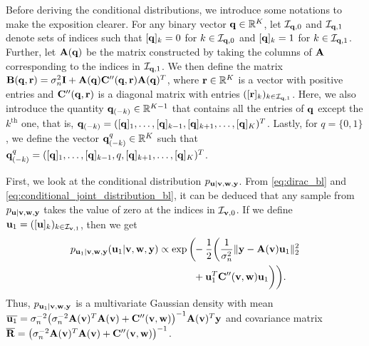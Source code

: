 \documentclass[journal]{IEEEtran}
\begin{document}
Before deriving the conditional distributions, we introduce some notations to make the exposition clearer. For any binary vector ${\bf{q}} \in \mathbb{R}^K$, let $\mathcal{I}_{{\bf{q}}, 0}$ and $\mathcal{I}_{{\bf{q}}, 1}$ denote sets of indices such that $[{\bf{q}}]_k = 0$ for $k \in \mathcal{I}_{{\bf{q}}, 0}$ and $[{\bf{q}}]_k = 1$ for $k \in \mathcal{I}_{{\bf{q}}, 1}$. Further, let ${\bf{A}}({\bf{q}})$ be the matrix constructed by taking the columns of ${\bf{A}}$ corresponding to the indices in $\mathcal{I}_{{\bf{q}}, 1}$. We then define the matrix ${\bf{B}}({\bf{q}}, {\bf{r}}) = \sigma_n^{2} {\bf{I}} + {\bf{A}}({\bf{q}}) {\bf{C}}''({\bf{q}}, {\bf{r}}) {\bf{A}}({\bf{q}})^{T}$, where ${\bf{r}} \in \mathbb{R}^K$ is a vector with positive entries and ${\bf{C}}''({\bf{q}}, {\bf{r}})$ is a diagonal matrix with entries $([{\bf{r}}]_k)_{k \in \mathcal{I}_{{\bf{q}}, 1}}$. Here, we also introduce the quantity ${\bf{q}}_{(-k)} \in \mathbb{R}^{K-1}$ that contains all the entries of ${\bf{q}}$ except the $k^{\text{th}}$ one, that is, ${\bf{q}}_{(-k)} = ([{\bf{q}}]_{1}, \ldots, [{\bf{q}}]_{k-1}, [{\bf{q}}]_{k+1}, \ldots, [{\bf{q}}]_{K})^T$. Lastly, for $q = \{0,1\}$, we define the vector ${\bf{q}}_{(-k)}^{q} \in \mathbb{R}^{K}$ such that ${\bf{q}}_{(-k)}^{q} = ([{\bf{q}}]_{1}, \ldots, [{\bf{q}}]_{k-1}, q, [{\bf{q}}]_{k+1}, \ldots, [{\bf{q}}]_{K})^T$.

First, we look at the conditional distribution $p_{{\bf{u}} | {\bf{v}}, {\bf{w}}, {\bf{y}}}$. From \eqref{eq:dirac_bl} and \eqref{eq:conditional_joint_distribution_bl}, it can be deduced that any sample from $p_{{\bf{u}} | {\bf{v}}, {\bf{w}}, {\bf{y}}}$ takes the value of zero at the indices in $\mathcal{I}_{{\bf{v}}, 0}$. If we define ${\bf{u}}_1 = ([{\bf{u}}]_k)_{k \in \mathcal{I}_{{\bf{v}}, 1}}$, then we get
\begin{align}\label{eq:conditional_u_bl}
    p_{\M u_1 | \M v, \M w, \M y}(\M u_1 | \M v, \M w, \M y) \propto  \exp\bigg(\hspace{-0.1cm}&-\frac{1}{2}\bigg(\frac{1}{\sigma_n^2}\|\M y - \M A(\M v) \M u_1\|_{2}^{2} \nonumber \\
    & + \M u_1^{T} \M C''(\M v, \M w) \M u_1 \bigg) \bigg).
\end{align}
Thus, $p_{{\bf{u}}_1 | {\bf{v}}, {\bf{w}}, {\bf{y}}}$ is a multivariate Gaussian density with mean $\overline{{\bf{u}}_1} = \sigma_n^{-2} \big(\sigma_n^{-2} {\bf{A}}({\bf{v}})^{T} {\bf{A}}({\bf{v}}) + {\bf{C}}''({\bf{v}}, {\bf{w}})\big)^{-1}{\bf{A}}({\bf{v}})^{T}{\bf{y}}$ and covariance matrix $\overline{{\bf{R}}} = \big(\sigma_n^{-2} {\bf{A}}({\bf{v}})^{T} {\bf{A}}({\bf{v}}) + {\bf{C}}''({\bf{v}}, {\bf{w}})\big)^{-1}$.
\end{document}
